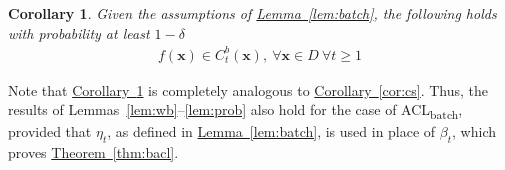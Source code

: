 \documentclass{article}
\def\*#1{\bm{#1}}
\newcommand{\theoremref}[1]{\hyperref[#1]{\mbox{Theorem~\ref*{#1}}}}
\newcommand{\lemmaref}[1]{\hyperref[#1]{\mbox{Lemma~\ref*{#1}}}}
\newcommand{\corref}[1]{\hyperref[#1]{\mbox{Corollary~\ref*{#1}}}}
\newtheorem{cor}{Corollary}
\newcommand{\bacl}{\textsf{ACL\textsubscript{batch}}\xspace}
\begin{document}
\begin{cor}
\label{cor:batch}
Given the assumptions of \lemmaref{lem:batch}, the following holds with
probability at least $1-\delta$
\begin{align*}
f(\*x) \in C_t^{b}(\*x),\ \forall \*x \in D\ \forall t \geq 1
\end{align*}
\end{cor}

Note that \corref{cor:batch} is completely analogous to \corref{cor:cs}.
Thus, the results of Lemmas~\ref{lem:wb}--\ref{lem:prob} also hold for
the case of \bacl, provided that $\eta_t$, as defined in \lemmaref{lem:batch},
is used in place of $\beta_t$, which proves \theoremref{thm:bacl}.
\end{document}
